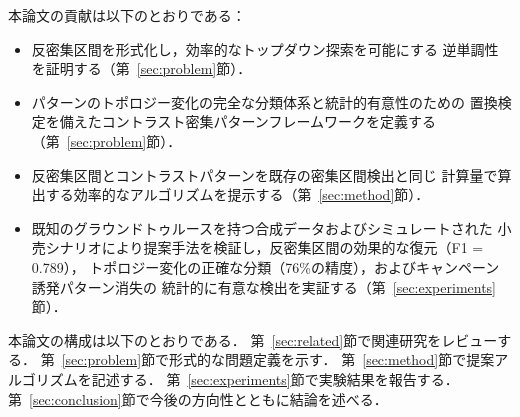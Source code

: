 本論文の貢献は以下のとおりである：
\begin{itemize}
\item 反密集区間を形式化し，効率的なトップダウン探索を可能にする
逆単調性を証明する（第~\ref{sec:problem}節）．
\item パターンのトポロジー変化の完全な分類体系と統計的有意性のための
置換検定を備えたコントラスト密集パターンフレームワークを定義する（第~\ref{sec:problem}節）．
\item 反密集区間とコントラストパターンを既存の密集区間検出と同じ
計算量で算出する効率的なアルゴリズムを提示する（第~\ref{sec:method}節）．
\item 既知のグラウンドトゥルースを持つ合成データおよびシミュレートされた
小売シナリオにより提案手法を検証し，反密集区間の効果的な復元（F1 = 0.789），
トポロジー変化の正確な分類（76\%の精度），およびキャンペーン誘発パターン消失の
統計的に有意な検出を実証する（第~\ref{sec:experiments}節）．
\end{itemize}

本論文の構成は以下のとおりである．
第~\ref{sec:related}節で関連研究をレビューする．
第~\ref{sec:problem}節で形式的な問題定義を示す．
第~\ref{sec:method}節で提案アルゴリズムを記述する．
第~\ref{sec:experiments}節で実験結果を報告する．
第~\ref{sec:conclusion}節で今後の方向性とともに結論を述べる．
